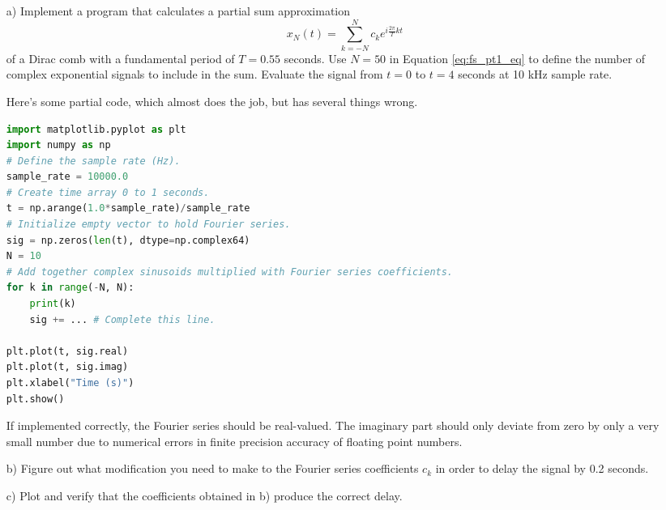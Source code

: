 \begin{itemize}
\item[a)] Implement a program that calculates a partial sum
  approximation
  \begin{equation}
    x_N(t) = \sum_{k=-N}^{N} c_k e^{i \frac{2\pi}{T}kt}
    \label{eq:fs_pt1_eq}
\end{equation}
  of a Dirac comb with a fundamental period of $T=0.55$ seconds. Use
  $N=50$ in Equation \ref{eq:fs_pt1_eq} to define the number of
  complex exponential signals to include in the sum. Evaluate the
  signal from $t=0$ to $t=4$ seconds at 10 kHz sample rate.

  Here's some partial code, which almost does the
  job, but has several things wrong.
\begin{lstlisting}[language=Python, numbers=none]
import matplotlib.pyplot as plt
import numpy as np
# Define the sample rate (Hz).
sample_rate = 10000.0
# Create time array 0 to 1 seconds.
t = np.arange(1.0*sample_rate)/sample_rate
# Initialize empty vector to hold Fourier series.
sig = np.zeros(len(t), dtype=np.complex64)
N = 10
# Add together complex sinusoids multiplied with Fourier series coefficients.
for k in range(-N, N):
    print(k)
    sig += ... # Complete this line.
    
plt.plot(t, sig.real)
plt.plot(t, sig.imag)
plt.xlabel("Time (s)")
plt.show()
\end{lstlisting}
If implemented correctly, the Fourier series should be real-valued. 
The imaginary part should only deviate from zero by only a
very small number due to numerical errors in finite precision
accuracy of floating point numbers.
  
\item[b)] Figure out what modification you need to make to the Fourier series coefficients $c_k$ in order to delay the signal by 0.2 seconds.

\item[c)] Plot and verify that the coefficients obtained in b) produce the correct delay.


\end{itemize}
